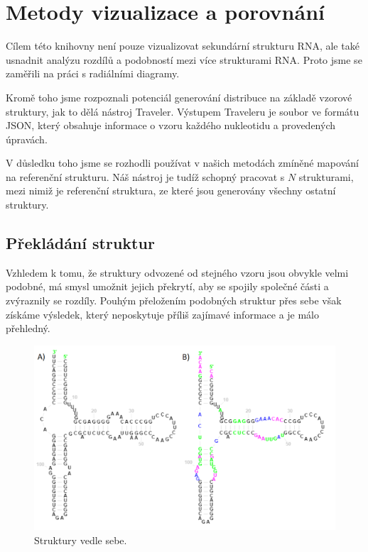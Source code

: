 
\chapter{Metody vizualizace a porovnání}

Cílem této knihovny není pouze vizualizovat sekundární strukturu RNA, ale také
usnadnit analýzu rozdílů a podobností mezi více strukturami RNA. Proto jsme se
zaměřili na práci s radiálními diagramy.

Kromě toho jsme rozpoznali potenciál generování distribuce na základě vzorové
struktury, jak to dělá nástroj Traveler. Výstupem Traveleru je soubor ve
formátu JSON, který obsahuje informace o vzoru každého nukleotidu a provedených
úpravách.

V důsledku toho jsme se rozhodli používat v našich metodách zmíněné mapování na
referenční strukturu. Náš nástroj je tudíž schopný pracovat s $N$ strukturami,
mezi nimiž je referenční struktura, ze které jsou generovány všechny ostatní
struktury.

\section{Překládání struktur}

Vzhledem k tomu, že struktury odvozené od stejného vzoru jsou obvykle velmi
podobné, má smysl umožnit jejich překrytí, aby se spojily společné části a
zvýraznily se rozdíly. Pouhým přeložením podobných struktur přes sebe však
získáme výsledek, který neposkytuje příliš zajímavé informace a je málo
přehledný.

\begin{figure}[H]
  \centering
  \includegraphics[width=140mm]{../img/kap02/align/structures.png}
  \caption{Struktury vedle sebe.}
\end{figure}

